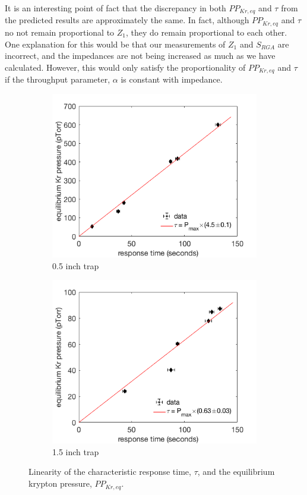 It is an interesting point of fact that the discrepancy in both $PP_{Kr,eq}$ and $\tau$ from the predicted results are approximately the same. In fact, although $PP_{Kr,eq}$ and $\tau$ no not remain proportional to $Z_1$, they do remain proportional to each other. One explanation for this would be that our measurements of $Z_1$ and $S_{RGA}$ are incorrect, and the impedances are not being increased as much as we have calculated. However, this would only satisfy the proportionality of $PP_{Kr,eq}$ and $\tau$ if the throughput parameter, $\alpha$ is constant with impedance. 
\begin{figure}[h!]
\centering
\begin{subfigure}{0.5\textwidth}
  \centering
  \includegraphics[width=\textwidth]{Figures/SLAC_imp_response_linfit.png}
  \caption{0.5 inch trap}
\end{subfigure}%
\begin{subfigure}{0.5\textwidth}
  \centering
  \includegraphics[width=\textwidth]{Figures/SLAC_imp_response_1p5in_linfit.png}
  \caption{1.5 inch trap}
\end{subfigure}
\caption{Linearity of the characteristic response time, $\tau$, and the equilibrium krypton pressure, $PP_{Kr,eq}$.} 
\label{fig:impresponse_lin}
\end{figure}

